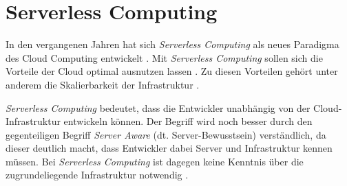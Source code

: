 \section{Serverless Computing} %
\label{sec:serverless-serveraware}





In den vergangenen Jahren hat sich \textit{Serverless Computing} als neues Paradigma des Cloud Computing entwickelt \cite[Vgl.][S. 44]{Castro2019}\cite[Vgl.][S. 64]{Anel2020}. Mit \textit{Serverless Computing} sollen sich die Vorteile der Cloud optimal ausnutzen lassen \cite[Vgl.][S. 6]{Eivy2017}\cite[Vgl.][S. 8]{Jonas2019}. Zu diesen Vorteilen gehört unter anderem die Skalierbarkeit der Infrastruktur \cite[Vgl.][S. 1ff]{Armbrust2009}\cite[Vgl.][S. 234]{Villamizar2017}\cite[Vgl.][S. 884]{Adzic2017}.

\textit{Serverless Computing} bedeutet, dass die Entwickler unabhängig von der Cloud-Infrastruktur entwickeln können. Der Begriff wird noch besser durch den gegenteiligen Begriff \textit{Server Aware} (dt. Server-Bewusstsein) verständlich, da dieser deutlich macht, dass Entwickler dabei Server und Infrastruktur kennen müssen. Bei \textit{Serverless Computing} ist dagegen keine Kenntnis über die zugrundeliegende Infrastruktur notwendig \cite[Vgl.][S. 5]{Jonas2019}\cite[Vgl.][S. 1]{Hellerstein2018}\cite[Vgl.][S. 46]{Castro2019}\cite[Vgl.][S. 64]{Anel2020}.

